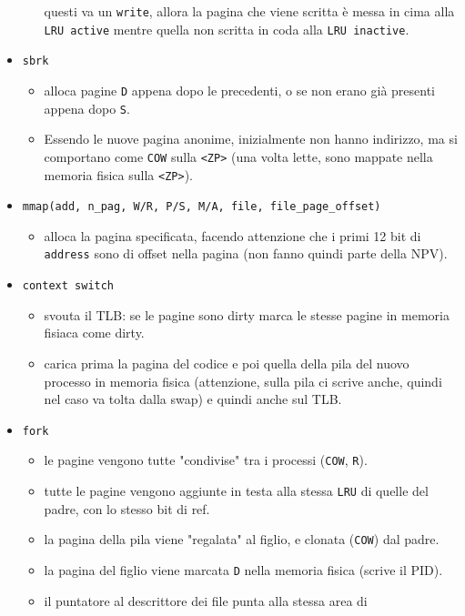 \documentclass[12pt, a4paper]{report}
\begin{document}
\begin{itemize}
\begin{itemize}
				questi va un \texttt{write}, allora la pagina che viene scritta
				è messa in cima alla \texttt{LRU active} mentre quella non
				scritta in coda alla \texttt{LRU inactive}.
		\end{itemize}
	\item \texttt{sbrk}
		\begin{itemize}
			\item alloca pagine \texttt{D} appena dopo le precedenti, o se non
				erano già presenti appena dopo \texttt{S}.
			\item Essendo le nuove pagina anonime, inizialmente non hanno
				indirizzo, ma si comportano come \texttt{COW} sulla
				\texttt{<ZP>} (una volta lette, sono mappate nella memoria
				fisica sulla \texttt{<ZP>}).
		\end{itemize}
	\item \texttt{mmap(add, n\_pag, W/R, P/S, M/A, file, file\_page\_offset)}
		\begin{itemize}
			\item alloca la pagina specificata, facendo attenzione che i primi
				12 bit di \texttt{address} sono di offset nella pagina (non fanno
				quindi parte della NPV).
		\end{itemize}
	\item \texttt{context switch}
		\begin{itemize}
			\item svouta il TLB: se le pagine sono dirty marca le stesse pagine
				in memoria fisiaca come dirty.
			\item carica prima la pagina del codice e poi quella della pila del
				nuovo processo in memoria fisica (attenzione, sulla pila ci
				scrive anche, quindi nel caso va tolta dalla swap) e quindi
		anche sul TLB. \end{itemize}
	\item \texttt{fork}
		\begin{itemize}
			\item le pagine vengono tutte "condivise" tra i processi
				(\texttt{COW}, \texttt{R}).
			\item tutte le pagine vengono aggiunte in testa alla stessa
				\texttt{LRU} di quelle del padre, con lo stesso bit di ref.
			\item la pagina della pila viene "regalata" al figlio, e clonata
				(\texttt{COW}) dal padre.
			\item la pagina del figlio viene marcata \texttt{D} nella memoria
				fisica (scrive il PID).
			\item il puntatore al descrittore dei file punta alla stessa area di

\end{itemize}
\end{itemize}
\end{document}
